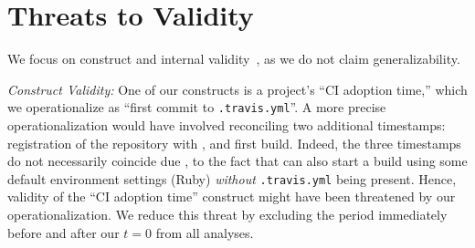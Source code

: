 
\section{Threats to Validity}
\label{sec:threats}
We focus on construct and internal validity~\cite{perry2000empirical}, as we 
do not claim generalizability.

\smallskip \emph{Construct Validity:} %
One of our constructs is a project's ``CI adoption time,'' which 
we operationalize as ``first commit to \texttt{.travis.yml}''. %
A more precise operationalization would have involved 
reconciling two additional timestamps: registration of the repository with \Tvis, and 
first build.
Indeed, the three timestamps do not necessarily coincide due \eg, to the fact that \Tvis can also start a build using some default 
environment settings (Ruby) \emph{without} \texttt{.travis.yml} being present.
Hence, validity of the ``CI adoption time'' construct might have been threatened 
by our operationalization.
We reduce this threat by excluding the period immediately before and after
our $t=0$ from all analyses.

